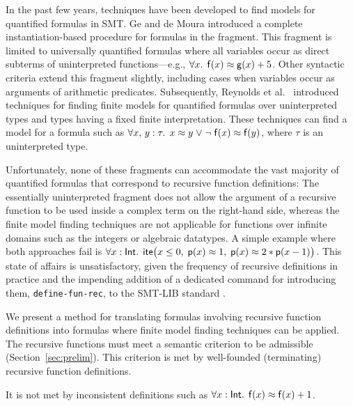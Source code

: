 In the past few years, techniques have been developed to find models for
quantified formulas in SMT.
Ge and de Moura \cite{GeDeM-CAV-09} introduced a complete instantiation-based
procedure for formulas in the  fragment.
This fragment is limited to universally quantified formulas where all
variables occur as direct subterms of uninterpreted
functions---e.g., $\forall x%
.\;\, \con{f}( x )
\teq \con{g}( x ) + 5$.
Other syntactic criteria extend
this fragment slightly, including cases when variables occur as arguments of
arithmetic predicates. Subsequently, Reynolds et al.\
\cite{ReyEtAl-1-RR-13,reynolds-et-al-2013} introduced techniques for finding finite
models for quantified
formulas over uninterpreted types and types having a fixed finite
interpretation. %
These techniques can
find a model for a formula such as $\forall x,\, y : \tau.\;\, x \teq
y \vee \allowbreak \neg \con{f}( x ) \teq \con{f}( y )$, where $\tau$ is an uninterpreted type.

Unfortunately, none of these fragments can accommodate the vast majority of
quantified formulas that correspond to recursive function definitions: The
essentially uninterpreted fragment does not allow the argument of a
recursive function to be used inside a complex term on the right-hand side,
whereas the finite model finding techniques %
are not applicable for functions over infinite domains such as the integers or
algebraic datatypes. A simple example where both approaches fail is
$\forall x : {\mathsf{Int}}.\;\, \mathsf{ite}\bigl(
x \leq 0,\allowbreak\; \mathsf{p}( x ) \approx 1,\allowbreak\; \mathsf{p}( x ) \approx 2 * \mathsf{p}( x - 1 ) \bigr)$.
This state of affairs is unsatisfactory, given the frequency of
recursive definitions in practice and the impending addition of a dedicated
command for introducing them, \texttt{define-fun-rec}, to the SMT-LIB standard \cite{smtlib25}.

We present a method for translating formulas involving recursive function
definitions into formulas where finite model finding techniques can be applied.
The recursive functions must meet a semantic criterion to be admissible
(Section~\ref{sec:prelim}). This criterion is met by well-founded (terminating)
recursive function definitions. \begin{longv}It is not met by inconsistent
definitions such as $\forall x : {\mathsf{Int}}.\;\, \mathsf{f}(x) \approx \mathsf{f}(x) +
1$.\end{longv} %

